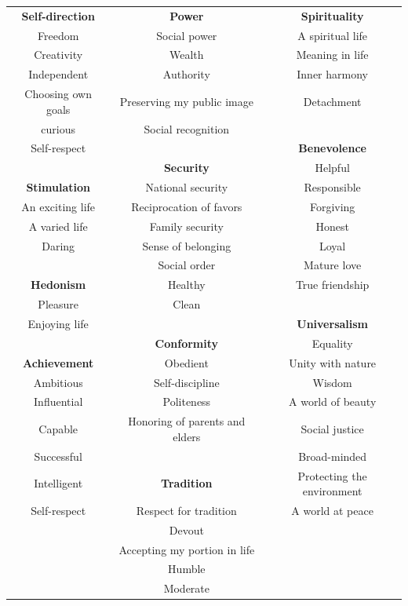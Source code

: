 {\begin{tabular}{ccc}
\textbf{Self-direction}	&	\textbf{Power}					&	\textbf{Spirituality}	\\
Freedom					&	Social power					&	A spiritual life	\\
Creativity				&	Wealth							&	Meaning in life	\\
Independent				&	Authority						&	Inner harmony	\\
Choosing own goals		&	Preserving my public image		&	Detachment	\\
curious					&	Social recognition				&	{}	\\
Self-respect			&	{}								&	\textbf{Benevolence}	\\
{}						&	\textbf{Security}				&	Helpful	\\
\textbf{Stimulation}	&	National security				&	Responsible	\\
An exciting life		&	Reciprocation of favors			&	Forgiving	\\
A varied life			&	Family security					&	Honest	\\
Daring					&	Sense of belonging				&	Loyal	\\
{}						&	Social order					&	Mature love	\\
\textbf{Hedonism}		&	Healthy							&	True friendship	\\
Pleasure				&	Clean							&	{}	\\
Enjoying life			&	{}								&	\textbf{Universalism}	\\
{}						&	\textbf{Conformity}				&	Equality	\\
\textbf{Achievement}	&	Obedient						&	Unity with nature	\\
Ambitious				&	Self-discipline					&	Wisdom	\\
Influential				&	Politeness						&	A world of beauty	\\
Capable					&	Honoring of parents and elders	&	Social justice	\\
Successful				&	{}								&	Broad-minded	\\
Intelligent				&	\textbf{Tradition}				&	Protecting the environment 	\\
Self-respect			&	Respect for tradition			&	A world at peace	\\
{}						&	Devout							&	{}	\\
{}						&	Accepting my portion in life	&	{}	\\
{}						&	Humble							&	{}	\\
{}						&	Moderate						&	{}

\end{tabular}
}